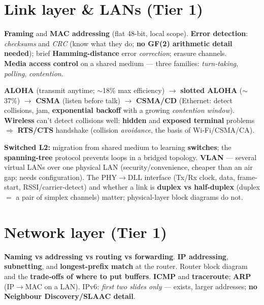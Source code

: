 \documentclass[11pt,a4paper]{article}
\begin{document}
\section{Link layer \& LANs (Tier 1)}

\begin{must}
\textbf{Framing} and \textbf{MAC addressing} (flat 48-bit, local scope). \textbf{Error detection}: \emph{checksums} and \emph{CRC} (know what they do; \textbf{no GF(2) arithmetic detail needed}); brief \textbf{Hamming-distance} error \emph{correction}; erasure channels.\\[2pt]
\textbf{Media access control} on a shared medium --- three families: \emph{turn-taking}, \emph{polling}, \emph{contention}.
\end{must}

\begin{must}[title=Multiple-access protocols]
\textbf{ALOHA} (transmit anytime; $\sim$18\% max efficiency) $\to$ \textbf{slotted ALOHA} ($\sim$37\%) $\to$ \textbf{CSMA} (listen before talk) $\to$ \textbf{CSMA/CD} (Ethernet: detect collisions, jam, \textbf{exponential backoff} with a growing \emph{contention window}). \\[2pt]
\textbf{Wireless} can't detect collisions well: \textbf{hidden} and \textbf{exposed terminal} problems $\Rightarrow$ \textbf{RTS/CTS} handshake (collision \emph{avoidance}, the basis of Wi-Fi/CSMA/CA).
\end{must}

\begin{useful}
\textbf{Switched L2:} migration from shared medium to learning \textbf{switches}; the \textbf{spanning-tree} protocol prevents loops in a bridged topology. \textbf{VLAN} --- several virtual LANs over one physical LAN (security/convenience, cheaper than an air gap; needs configuration). The PHY$\to$DLL interface (Tx/Rx clock, data, frame-start, RSSI/carrier-detect) and whether a link is \textbf{duplex vs half-duplex} (duplex $=$ a pair of simplex channels) matter; physical-layer block diagrams do not.
\end{useful}

\section{Network layer (Tier 1)}

\begin{must}[title=Addressing \& forwarding]
\textbf{Naming vs addressing vs routing vs forwarding}. \textbf{IP addressing}, \textbf{subnetting}, and \textbf{longest-prefix match} at the router. Router block diagram and the \textbf{trade-offs of where to put buffers}. \textbf{ICMP} and \textbf{traceroute}; \textbf{ARP} (IP$\to$MAC on a LAN). IPv6: \emph{first two slides only} --- exists, larger addresses; \textbf{no Neighbour Discovery/SLAAC detail}.
\end{must}
\end{document}
